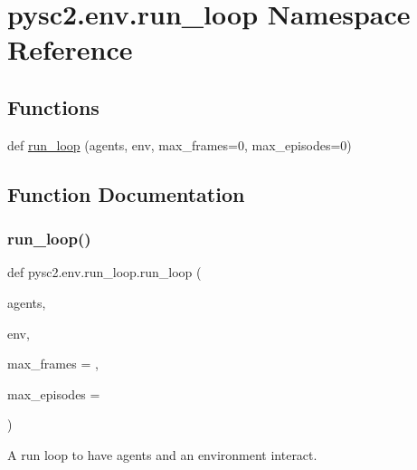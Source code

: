 \hypertarget{namespacepysc2_1_1env_1_1run__loop}{}\section{pysc2.\+env.\+run\+\_\+loop Namespace Reference}
\label{namespacepysc2_1_1env_1_1run__loop}
\subsection*{Functions}
\begin{DoxyCompactItemize}
\item 
def \mbox{\hyperlink{namespacepysc2_1_1env_1_1run__loop_a159e3d003c8be4a25d29941afdb2b091}{run\+\_\+loop}} (agents, env, max\+\_\+frames=0, max\+\_\+episodes=0)
\end{DoxyCompactItemize}


\subsection{Function Documentation}
\mbox{\label{namespacepysc2_1_1env_1_1run__loop_a159e3d003c8be4a25d29941afdb2b091}} 
\subsubsection{\texorpdfstring{run\+\_\+loop()}{run\_loop()}}
{\footnotesize\ttfamily def pysc2.\+env.\+run\+\_\+loop.\+run\+\_\+loop (\begin{DoxyParamCaption}\item[{}]{agents,  }\item[{}]{env,  }\item[{}]{max\+\_\+frames = {},  }\item[{}]{max\+\_\+episodes = {} }\end{DoxyParamCaption})}

\begin{DoxyVerb}A run loop to have agents and an environment interact.\end{DoxyVerb}
 